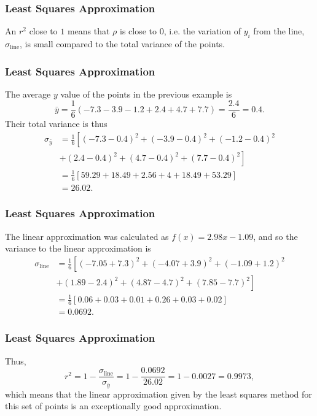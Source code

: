 \begin{frame}
	\frametitle{Least Squares Approximation}
	An $r^{2}$ close to $1$ means that $\rho$ is close to $0$, i.e. the variation of $y_{i}$ from the line, $\sigma_{\text{line}}$, is small compared to the total variance of the points.
\end{frame}

\begin{frame}
	\frametitle{Least Squares Approximation}
	\begin{presentation_example}
		The average $y$ value of the points in the previous example is
		\begin{equation*}
			\bar{y} = \frac{1}{6}\left( -7.3-3.9-1.2+2.4+4.7+7.7 \right) = \frac{2.4}{6} = 0.4.
		\end{equation*}
		Their total variance is thus
		\begin{align*}
			\sigma_{\bar{y}} &= \frac{1}{6}\left[ \left( -7.3-0.4 \right)^{2} + \left( -3.9-0.4 \right)^{2} + \left( -1.2-0.4 \right)^{2}\right.\\
			&\left.+ \left( 2.4-0.4 \right)^{2} + \left( 4.7-0.4 \right)^{2} + \left( 7.7-0.4 \right)^{2} \right]\\
			&= \frac{1}{6}\left[ 59.29 + 18.49 + 2.56 + 4 + 18.49 + 53.29 \right]\\
			&= 26.02.
		\end{align*}
	\end{presentation_example}
\end{frame}

\begin{frame}
	\frametitle{Least Squares Approximation}
	\begin{presentation_example}
		The linear approximation was calculated as $f(x)=2.98x-1.09$, and so the variance to the linear approximation is
		\begin{align*}
		\sigma_{\text{line}} &= \frac{1}{6}\left[ (-7.05+7.3)^{2}+(-4.07+3.9)^{2}+(-1.09+1.2)^{2}\right.\\
			&\left.+(1.89-2.4)^{2}+(4.87-4.7)^{2}+(7.85-7.7)^{2}\right]\\
			&= \frac{1}{6}\left[0.06+0.03+0.01+0.26+0.03+0.02\right]\\
			&= 0.0692.
		\end{align*}
	\end{presentation_example}
\end{frame}

\begin{frame}
	\frametitle{Least Squares Approximation}
	\begin{presentation_example}
		Thus,
		\begin{equation*}
			r^{2} = 1-\frac{\sigma_{\text{line}}}{\sigma_{\bar{y}}} = 1-\frac{0.0692}{26.02} = 1-0.0027 = 0.9973,
		\end{equation*}
		which means that the linear approximation given by the least squares method for this set of points is an exceptionally good approximation.
	\end{presentation_example}
\end{frame}
